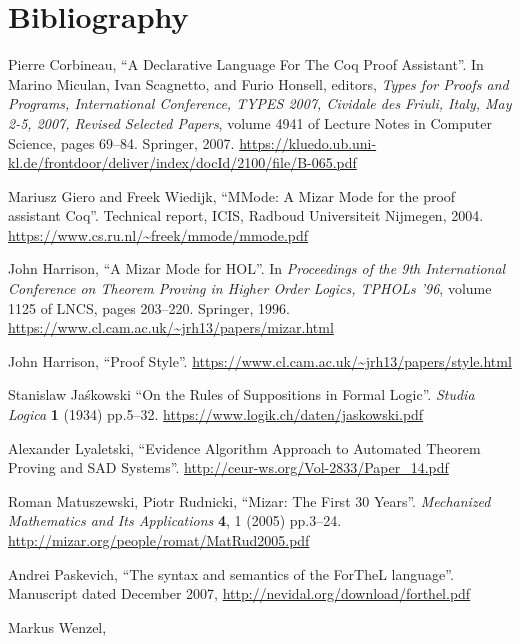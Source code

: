 \section{Bibliography}

\begin{enumerate}[label={[\arabic*]},left=0pt]
\item\label{corbineau-czar} Pierre Corbineau,
  ``A Declarative Language For The Coq Proof Assistant''.
  In Marino Miculan, Ivan Scagnetto, and Furio Honsell, editors, \emph{Types for Proofs and Programs, International Conference, TYPES 2007, Cividale des Friuli, Italy, May 2-5, 2007, Revised Selected Papers},
  volume 4941 of Lecture Notes in Computer Science, pages 69--84. Springer, 2007.
  \url{https://kluedo.ub.uni-kl.de/frontdoor/deliver/index/docId/2100/file/B-065.pdf}
\item\label{giero-wiedijk-mmode} Mariusz Giero and Freek Wiedijk,
  ``MMode: A Mizar Mode for the proof assistant Coq''.
  Technical report, ICIS, Radboud Universiteit Nijmegen, 2004.
  \url{https://www.cs.ru.nl/~freek/mmode/mmode.pdf}
\item\label{harrison-mizar-mode} John Harrison,
  ``A Mizar Mode for HOL''.
  In \emph{Proceedings of the 9th International Conference on Theorem Proving in Higher Order Logics, TPHOLs '96}, volume
  1125 of LNCS, pages 203--220. Springer, 1996.
  \url{https://www.cl.cam.ac.uk/~jrh13/papers/mizar.html}
\item\label{harrison:proof-style} John Harrison,
  ``Proof Style''.
  \url{https://www.cl.cam.ac.uk/~jrh13/papers/style.html}
\item Stanislaw Ja\'skowski
  ``On the Rules of Suppositions in Formal Logic''.
  \emph{Studia Logica} \textbf{1} (1934) pp.5--32.
  \url{https://www.logik.ch/daten/jaskowski.pdf}
\item\label{lyaletski-sad} Alexander Lyaletski,
  ``Evidence  Algorithm  Approach  to  Automated  Theorem  Proving 
  and SAD Systems''.
  \url{http://ceur-ws.org/Vol-2833/Paper_14.pdf}
\item\label{matuszewski:mizar} Roman Matuszewski, Piotr Rudnicki,
  ``Mizar: The First 30 Years''.
  \emph{Mechanized Mathematics and Its Applications} \textbf{4}, 1 (2005) pp.3--24.
  \url{http://mizar.org/people/romat/MatRud2005.pdf}
\item\label{paskevich-forthel} Andrei Paskevich,
  ``The syntax and semantics of the ForTheL language''.
  Manuscript dated December 2007,
  \url{http://nevidal.org/download/forthel.pdf}
\item\label{wenzel:tphols99} Markus Wenzel,

\end{enumerate}
